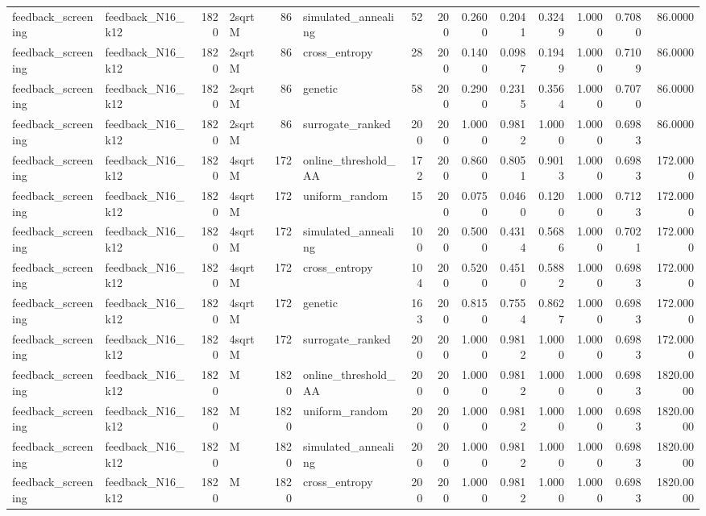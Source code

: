 \begin{tabular}{llrlrlrrrrrrrr}
feedback\_screening & feedback\_N16\_k12 & 1820 & 2sqrtM & 86 & simulated\_annealing & 52 & 200 & 0.2600 & 0.2041 & 0.3249 & 1.0000 & 0.7080 & 86.0000 \\
feedback\_screening & feedback\_N16\_k12 & 1820 & 2sqrtM & 86 & cross\_entropy & 28 & 200 & 0.1400 & 0.0987 & 0.1949 & 1.0000 & 0.7109 & 86.0000 \\
feedback\_screening & feedback\_N16\_k12 & 1820 & 2sqrtM & 86 & genetic & 58 & 200 & 0.2900 & 0.2315 & 0.3564 & 1.0000 & 0.7070 & 86.0000 \\
feedback\_screening & feedback\_N16\_k12 & 1820 & 2sqrtM & 86 & surrogate\_ranked & 200 & 200 & 1.0000 & 0.9812 & 1.0000 & 1.0000 & 0.6983 & 86.0000 \\
feedback\_screening & feedback\_N16\_k12 & 1820 & 4sqrtM & 172 & online\_threshold\_AA & 172 & 200 & 0.8600 & 0.8051 & 0.9013 & 1.0000 & 0.6983 & 172.0000 \\
feedback\_screening & feedback\_N16\_k12 & 1820 & 4sqrtM & 172 & uniform\_random & 15 & 200 & 0.0750 & 0.0460 & 0.1200 & 1.0000 & 0.7123 & 172.0000 \\
feedback\_screening & feedback\_N16\_k12 & 1820 & 4sqrtM & 172 & simulated\_annealing & 100 & 200 & 0.5000 & 0.4314 & 0.5686 & 1.0000 & 0.7021 & 172.0000 \\
feedback\_screening & feedback\_N16\_k12 & 1820 & 4sqrtM & 172 & cross\_entropy & 104 & 200 & 0.5200 & 0.4510 & 0.5882 & 1.0000 & 0.6983 & 172.0000 \\
feedback\_screening & feedback\_N16\_k12 & 1820 & 4sqrtM & 172 & genetic & 163 & 200 & 0.8150 & 0.7554 & 0.8627 & 1.0000 & 0.6983 & 172.0000 \\
feedback\_screening & feedback\_N16\_k12 & 1820 & 4sqrtM & 172 & surrogate\_ranked & 200 & 200 & 1.0000 & 0.9812 & 1.0000 & 1.0000 & 0.6983 & 172.0000 \\
feedback\_screening & feedback\_N16\_k12 & 1820 & M & 1820 & online\_threshold\_AA & 200 & 200 & 1.0000 & 0.9812 & 1.0000 & 1.0000 & 0.6983 & 1820.0000 \\
feedback\_screening & feedback\_N16\_k12 & 1820 & M & 1820 & uniform\_random & 200 & 200 & 1.0000 & 0.9812 & 1.0000 & 1.0000 & 0.6983 & 1820.0000 \\
feedback\_screening & feedback\_N16\_k12 & 1820 & M & 1820 & simulated\_annealing & 200 & 200 & 1.0000 & 0.9812 & 1.0000 & 1.0000 & 0.6983 & 1820.0000 \\
feedback\_screening & feedback\_N16\_k12 & 1820 & M & 1820 & cross\_entropy & 200 & 200 & 1.0000 & 0.9812 & 1.0000 & 1.0000 & 0.6983 & 1820.0000 \\

\end{tabular}
